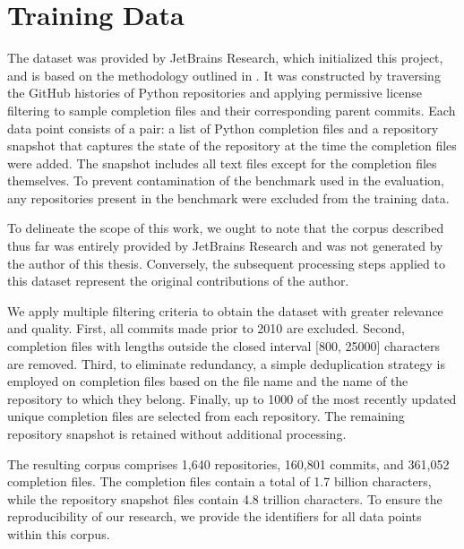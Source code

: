 \section{Training Data}

The dataset was provided by JetBrains Research, which initialized this project, and is based on the methodology outlined in \citet{bogomolov2024}. It was constructed by traversing the GitHub histories of Python repositories and applying permissive license filtering to sample completion files and their corresponding parent commits. Each data point consists of a pair: a list of Python completion files and a repository snapshot that captures the state of the repository at the time the completion files were added. The snapshot includes all text files except for the completion files themselves. To prevent contamination of the benchmark used in the evaluation, any repositories present in the benchmark were excluded from the training data.

To delineate the scope of this work, we ought to note that the corpus described thus far was entirely provided by JetBrains Research and was not generated by the author of this thesis. Conversely, the subsequent processing steps applied to this dataset represent the original contributions of the author.

We apply multiple filtering criteria to obtain the dataset with greater relevance and quality. First, all commits made prior to 2010 are excluded. Second, completion files with lengths outside the closed interval [800, 25000] characters are removed. Third, to eliminate redundancy, a simple deduplication strategy is employed on completion files based on the file name and the name of the repository to which they belong. Finally, up to 1000 of the most recently updated unique completion files are selected from each repository. The remaining repository snapshot is retained without additional processing. \parencite{sapronov2025}

The resulting corpus comprises 1,640 repositories, 160,801 commits, and 361,052 completion files. The completion files contain a total of 1.7 billion characters, while the repository snapshot files contain 4.8 trillion characters. To ensure the reproducibility of our research, we provide the identifiers for all data points within this corpus.

